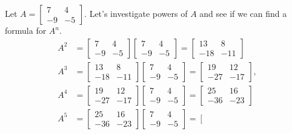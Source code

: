\documentclass[../main.tex]{subfiles}
\begin{document}
\begin{example} Let $A=\left[\begin{array}{cc}7 & 4 \\ -9 & -5\end{array}\right]$. Let's investigate powers of $A$ and see if we can find a formula for $A^{n}$.
$$
\begin{aligned}
A^{2} &=\left[\begin{array}{cc}
7 & 4 \\
-9 & -5
\end{array}\right]\left[\begin{array}{cc}
7 & 4 \\
-9 & -5
\end{array}\right]=\left[\begin{array}{cc}
13 & 8 \\
-18 & -11
\end{array}\right] \\
A^{3} &=\left[\begin{array}{cc}
13 & 8 \\
-18 & -11
\end{array}\right]\left[\begin{array}{cc}
7 & 4 \\
-9 & -5
\end{array}\right]=\left[\begin{array}{cc}
19 & 12 \\
-27 & -17
\end{array}\right], \\
A^{4} &=\left[\begin{array}{cc}
19 & 12 \\
-27 & -17
\end{array}\right]\left[\begin{array}{cc}
7 & 4 \\
-9 & -5
\end{array}\right]=\left[\begin{array}{cc}
25 & 16 \\
-36 & -23
\end{array}\right] \\
A^{5} &=\left[\begin{array}{cc}
25 & 16 \\
-36 & -23
\end{array}\right]\left[\begin{array}{cc}
7 & 4 \\
-9 & -5
\end{array}\right]=\left[\begin{array}{cc}

\end{array}
\end{aligned}$$
\end{example}
\end{document}
